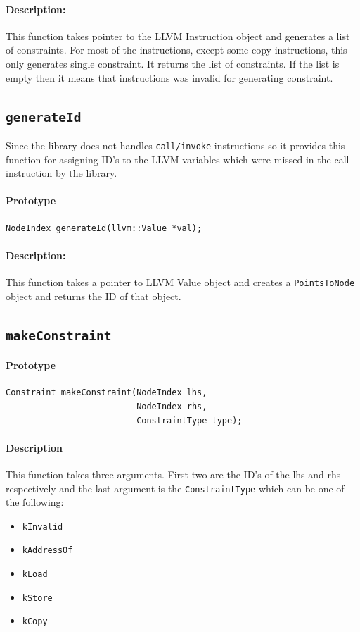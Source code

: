 \documentclass[a4paper,12pt]{report}
\begin{document}
\paragraph{Description:}
This function takes pointer to the LLVM Instruction object and generates a list
of constraints. For most of the instructions, except some copy instructions,
this only generates single constraint. It returns the list of constraints. If
the list is empty then it means that instructions was invalid for generating
constraint.

\subsection{\texttt{generateId}}
Since the library does not handles \texttt{call/invoke} instructions so it provides
this function for assigning ID's to the LLVM variables which were missed in the call
instruction by the library.

\paragraph{Prototype}
\begin{verbatim}
NodeIndex generateId(llvm::Value *val);
\end{verbatim}

\paragraph{Description:}
This function takes a pointer to LLVM Value object and creates a \texttt{PointsToNode}
object and returns the ID of that object.

\subsection{\texttt{makeConstraint}}
\paragraph{Prototype}
\begin{verbatim}
Constraint makeConstraint(NodeIndex lhs,
                          NodeIndex rhs,
                          ConstraintType type);
\end{verbatim}

\paragraph{Description}
This function takes three arguments. First two are the ID's of the lhs and rhs
respectively and the last argument is the \texttt{ConstraintType} which can be
one of the following:
\begin{itemize}
    \item \texttt{kInvalid}
    \item \texttt{kAddressOf}
    \item \texttt{kLoad}
    \item \texttt{kStore}
    \item \texttt{kCopy}
\end{itemize}
\end{document}
